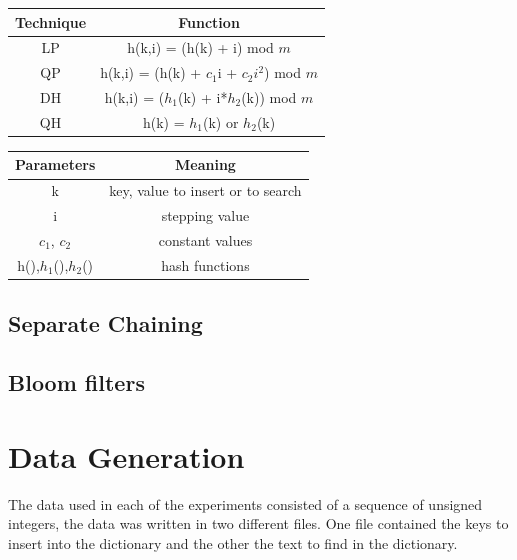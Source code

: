 \documentclass{article}
\begin{document}
\begin{center}
\begin{tabular}{c|c}
    Technique & Function\\
\hline
    LP & h(k,i) = (h(k) + i) mod $m$ \\
\hline
    QP & h(k,i) = (h(k) + $c_1$i + $c_2i^2$) mod $m$ \\
\hline
    DH & h(k,i) = ($h_1$(k) + i*$h_2$(k)) mod $m$ \\
\hline
    QH & h(k) = $h_1$(k) or $h_2$(k) \\
\end{tabular}

\begin{tabular}{c|c}
    Parameters & Meaning \\
\hline
    k & key, value to insert or to search \\
\hline
    i & stepping value \\
\hline
    $c_1$, $c_2$ & constant values \\
\hline
    h(),$h_1$(),$h_2$() & hash functions \\
\end{tabular}
\end{center}

    \subsection{Separate Chaining}
    
    \subsection{Bloom filters}

    \section{Data Generation}
        The data used in each of the experiments consisted of a sequence of unsigned integers,  
        the data was written in two different files. One file contained the keys to insert into the dictionary and the other the text to find in the dictionary. 
       
\end{document}
